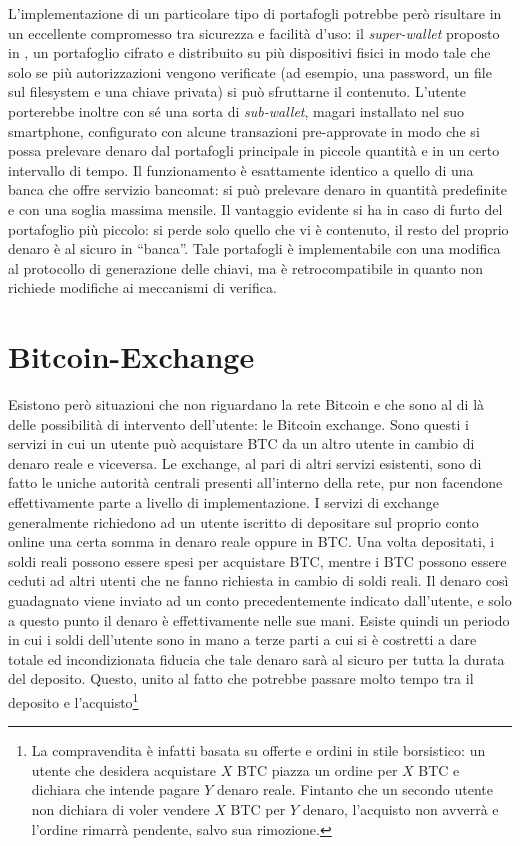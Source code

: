 L'implementazione di un particolare tipo di portafogli potrebbe però risultare in un eccellente compromesso tra sicurezza e facilità d'uso: il \emph{super-wallet} proposto in \cite{bitter-better}, un portafoglio cifrato e distribuito su più dispositivi fisici in modo tale che solo se più autorizzazioni vengono verificate (ad esempio, una password, un file sul filesystem e una chiave privata) si può sfruttarne il contenuto. L'utente porterebbe inoltre con sé una sorta di \emph{sub-wallet}, magari installato nel suo smartphone, configurato con alcune transazioni pre-approvate in modo che si possa prelevare denaro dal portafogli principale in piccole quantità e in un certo intervallo di tempo. Il funzionamento è esattamente identico a quello di una banca che offre servizio bancomat: si può prelevare denaro in quantità predefinite e con una soglia massima mensile. Il vantaggio evidente si ha in caso di furto del portafoglio più piccolo: si perde solo quello che vi è contenuto, il resto del proprio denaro è al sicuro in ``banca''.
Tale portafogli è implementabile con una modifica al protocollo di generazione delle chiavi, ma è retrocompatibile in quanto non richiede modifiche ai meccanismi di verifica.

\section{Bitcoin-Exchange}\label{bitcoin-exchange}

Esistono però situazioni che non riguardano la rete Bitcoin e che sono al di là delle possibilità di intervento dell'utente: le Bitcoin exchange.
Sono questi i servizi in cui un utente può acquistare BTC da un altro utente in cambio di denaro reale e viceversa. Le exchange, al pari di altri servizi esistenti, sono di fatto le uniche autorità centrali presenti all'interno della rete, pur non facendone effettivamente parte a livello di implementazione.
I servizi di exchange generalmente richiedono ad un utente iscritto di depositare sul proprio conto online una certa somma in denaro reale oppure in BTC. Una volta depositati, i soldi reali possono essere spesi per acquistare BTC, mentre i BTC possono essere ceduti ad altri utenti che ne fanno richiesta in cambio di soldi reali. Il denaro così guadagnato viene inviato ad un conto precedentemente indicato dall'utente, e solo a questo punto il denaro è effettivamente nelle sue mani.
Esiste quindi un periodo in cui i soldi dell'utente sono in mano a terze parti a cui si è costretti a dare totale ed incondizionata fiducia che tale denaro sarà al sicuro per tutta la durata del deposito. Questo, unito al fatto che potrebbe passare molto tempo tra il deposito e l'acquisto\footnote{La compravendita è infatti basata su offerte e ordini in stile borsistico: un utente che desidera acquistare $X$ BTC piazza un ordine per $X$ BTC e dichiara che intende pagare $Y$ denaro reale. Fintanto che un secondo utente non dichiara di voler vendere $X$ BTC per $Y$ denaro, l'acquisto non avverrà e l'ordine rimarrà pendente, salvo sua rimozione.}


